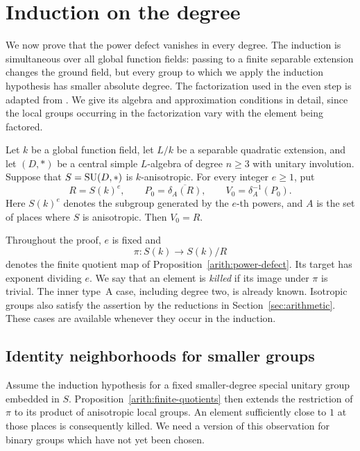 \section{Induction on the degree}\label{sec:induction}

We now prove that the power defect vanishes in every degree.  The
induction is simultaneous over all global function fields: passing to a
finite separable extension changes the ground field, but every group to
which we apply the induction hypothesis has smaller absolute degree.
The factorization used in the even step is adapted from
\cite[Section~7]{MPNF}.  We give its algebra and approximation conditions
in detail, since the local groups occurring in the factorization vary
with the element being factored.

\begin{theorem}\label{ind:main}
Let $k$ be a global function field, let $L/k$ be a separable quadratic
extension, and let $(D,*)$ be a central simple $L$-algebra of degree
$n\geq 3$ with unitary involution.  Suppose that $S=\operatorname{SU}(D,*)$ is
$k$-anisotropic.  For every integer $e\geq 1$, put
\[
 R=S(k)^e,\qquad P_0=\overline{\delta_A(R)},\qquad
 V_0=\delta_A^{-1}(P_0).
\]
Here $S(k)^e$ denotes the subgroup generated by the $e$-th powers, and
$A$ is the set of places where $S$ is anisotropic.  Then $V_0=R$.
\end{theorem}

Throughout the proof, $e$ is fixed and
\[
                 \pi:S(k)\longrightarrow S(k)/R
\]
denotes the finite quotient map of Proposition~\ref{arith:power-defect}.
Its target has exponent dividing $e$.  We say that an element is
\emph{killed} if its image under $\pi$ is trivial.  The inner type~A
case, including degree two, is already known.  Isotropic groups also
satisfy the assertion by the reductions in
Section~\ref{sec:arithmetic}.  These cases are available whenever they
occur in the induction.

\subsection{Identity neighborhoods for smaller groups}

Assume the induction hypothesis for a fixed smaller-degree special
unitary group embedded in $S$.  Proposition~\ref{arith:finite-quotients}
then extends the restriction of $\pi$
to its product of anisotropic local groups.  An element sufficiently
close to $1$ at those places is consequently killed.  We need a version
of this observation for binary groups which have not yet been chosen.

